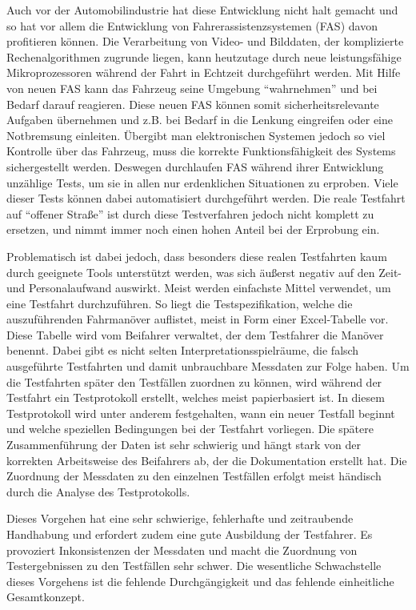 \documentclass[12pt,a4paper]{report}
\begin{document}
Auch vor der Automobilindustrie hat diese Entwicklung nicht halt gemacht und so hat vor allem die Entwicklung von Fahrerassistenzsystemen (FAS) davon profitieren können. Die Verarbeitung von Video- und Bilddaten, der komplizierte Rechenalgorithmen zugrunde liegen, kann heutzutage durch neue leistungsfähige Mikroprozessoren während der Fahrt in Echtzeit durchgeführt werden. Mit Hilfe von neuen FAS kann das Fahrzeug seine Umgebung "`wahrnehmen"' und bei Bedarf darauf reagieren. Diese neuen FAS können somit sicherheitsrelevante Aufgaben übernehmen und z.B. bei Bedarf in die Lenkung eingreifen oder eine Notbremsung einleiten. Übergibt man elektronischen Systemen jedoch so viel Kontrolle über das Fahrzeug, muss die korrekte Funktionsfähigkeit des Systems sichergestellt werden. Deswegen durchlaufen FAS während ihrer Entwicklung unzählige Tests, um sie in allen nur erdenklichen Situationen zu erproben. Viele dieser Tests können dabei automatisiert durchgeführt werden. Die reale Testfahrt auf "`offener Stra\ss e"' ist durch diese Testverfahren jedoch nicht komplett zu ersetzen, und nimmt immer noch einen hohen Anteil bei der Erprobung ein. 

Problematisch ist dabei jedoch, dass besonders diese realen Testfahrten kaum durch geeignete Tools unterstützt werden, was sich äu\ss erst negativ auf den Zeit- und Personalaufwand auswirkt. Meist werden einfachste Mittel verwendet, um eine Testfahrt durchzuführen. So liegt die Testspezifikation, welche die auszuführenden Fahrmanöver auflistet, meist in Form einer Excel-Tabelle vor. Diese Tabelle wird vom Beifahrer verwaltet, der dem Testfahrer die Manöver benennt. Dabei gibt es nicht selten Interpretationsspielräume, die falsch ausgeführte Testfahrten und damit unbrauchbare Messdaten zur Folge haben. Um die Testfahrten später den Testfällen zuordnen zu können, wird während der Testfahrt ein Testprotokoll erstellt, welches meist papierbasiert ist. In diesem Testprotokoll wird unter anderem festgehalten, wann ein neuer Testfall beginnt und welche speziellen Bedingungen bei der Testfahrt vorliegen. Die spätere Zusammenführung der Daten ist sehr schwierig und hängt stark von der korrekten Arbeitsweise des Beifahrers ab, der die Dokumentation erstellt hat. Die Zuordnung der Messdaten zu den einzelnen Testfällen erfolgt meist händisch durch die Analyse des Testprotokolls.

Dieses Vorgehen hat eine sehr schwierige, fehlerhafte und zeitraubende Handhabung und erfordert zudem eine gute Ausbildung der Testfahrer. Es provoziert Inkonsistenzen der Messdaten und macht die Zuordnung von Testergebnissen zu den Testfällen sehr schwer. Die wesentliche Schwachstelle dieses Vorgehens ist die fehlende Durchgängigkeit und das fehlende einheitliche Gesamtkonzept.
\end{document}
